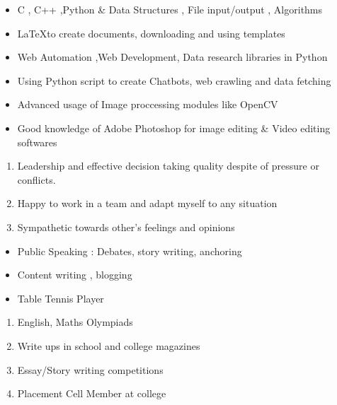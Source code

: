 \documentclass{article}
\begin{document}
	
	
			\begin{itemize}
			\color{black}	\item C , C++ ,Python \& Data Structures , File input/output , Algorithms
			\color{black}	\item  \LaTeX to create documents, downloading and using templates
			\color{black} \item Web Automation ,Web Development, Data research libraries in Python
			\color{black} \item Using Python script to create Chatbots, web crawling and data fetching
			\color{black} \item Advanced usage of Image proccessing modules like OpenCV
			\color{black} \item Good knowledge of Adobe Photoshop for image editing \& Video editing softwares
		\end{itemize}
	\begin{enumerate}
		\LARGE
			\color{black}	\item Leadership and effective decision taking quality despite of pressure or conflicts.
		\item  Happy to work in a team and adapt myself to any situation
		\item Sympathetic towards other's feelings and opinions
	\end{enumerate}
\begin{itemize}
	\LARGE
	\color{black}	\item Public Speaking : Debates, story writing, anchoring
	\item Content writing , blogging
	\item Table Tennis Player
\end{itemize}
\begin{enumerate}
	\LARGE
	\color{black}	\item English, Maths Olympiads
	\item Write ups in school and college magazines
	\item Essay/Story writing competitions
	\item Placement Cell Member at college 
	
\end{enumerate}		
\end{document}
